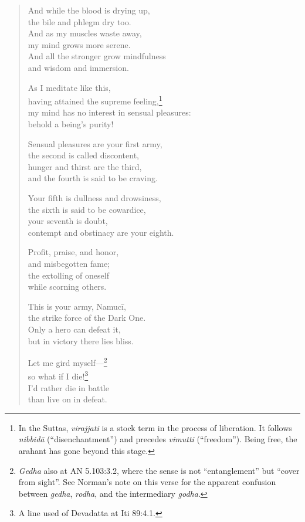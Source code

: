 \documentclass[12pt,openany]{book}%
\begin{document}
\begin{verse}
And while the blood is drying up, \\
the bile and phlegm dry too. \\
And as my muscles waste away, \\
my mind grows more serene. \\
And all the stronger grow mindfulness \\
and wisdom and immersion. 

As I meditate like this, \\
having attained the supreme feeling,\footnote{In the Suttas, \textit{virajjati} is a stock term in the process of liberation. It follows \textit{\textsanskrit{nibbidā}} (“disenchantment”) and precedes \textit{vimutti} (“freedom”). Being free, the arahant has gone beyond this stage. } \\
my mind has no interest in sensual pleasures: \\
behold a being’s purity! 

Sensual pleasures are your first army, \\
the second is called discontent, \\
hunger and thirst are the third, \\
and the fourth is said to be craving. 

Your fifth is dullness and drowsiness, \\
the sixth is said to be cowardice, \\
your seventh is doubt, \\
contempt and obstinacy are your eighth. 

Profit, praise, and honor, \\
and misbegotten fame; \\
the extolling of oneself \\
while scorning others. 

This is your army, \textsanskrit{Namucī}, \\
the strike force of the Dark One. \\
Only a hero can defeat it, \\
but in victory there lies bliss. 

Let me gird myself—\footnote{\textit{Gedha} also at AN 5.103:3.2, where the sense is not “entanglement” but “cover from sight”. See Norman’s note on this verse for the apparent confusion between \textit{gedha}, \textit{rodha}, and the intermediary \textit{godha}. } \\
so what if I die!\footnote{A line used of Devadatta at Iti 89:4.1. } \\
I’d rather die in battle \\
than live on in defeat. 


\end{verse}
\end{document}
